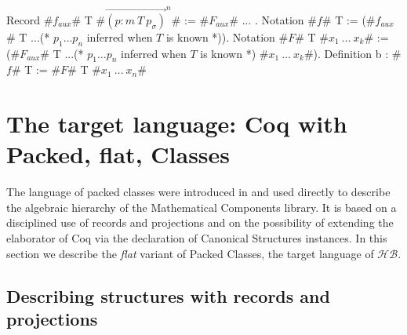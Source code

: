 \documentclass[a4paper,UKenglish,cleveref, autoref]{lipics-v2019}
\newcommand{\HB}{\ensuremath{\mathcal{HB}}}
\newcommand{\C}{\ensuremath{\mathcal{C}}}
\newcommand{\class}{class}
\newcommand{\cdef}{\ensuremath{\mathit{def}}}
\newcommand{\subclass}{subclass}
\newcommand{\join}{\ensuremath{\mathit{join}}}
\newcommand{\vect}[1]{\overrightarrow{#1}}
\newcommand{\pmp}[1]{\ensuremath{\vect{\left(p : m\ T\ p_\sigma\right)}^{#1}}}
\theoremstyle{implem}
\theoremstyle{implem}
\theoremstyle{command}
\theoremstyle{commands}
\begin{document}
\begin{coqcode}
Record #\(f_{aux}\)# T #\(\pmp{n}\)# := #\(F_{aux}\)# { ... }.
Notation #$f$# T := (#\(f_{aux}\)# T ...(* $p_1 \ldots p_n$ inferred when $T$ is known *)).
Notation #$F$# T  #\(x_1\ \ldots\ x_k\)# := (#\(F_{aux}\)# T ...(* $p_1 \ldots p_n$ inferred when $T$ is known *) #\(x_1\ \ldots\ x_k\)#).
Definition b : #$f$# T := #$F$# T #\(x_1\ \ldots\ x_n\)#
\end{coqcode}









\section{The target language: Coq with Packed, flat, Classes}
\label{sec:target-lang}

The language of packed classes were introduced in
\cite{DBLP:conf/tphol/GarillotGMR09} and used directly to describe the
algebraic hierarchy of the Mathematical Components library.
It is based on a disciplined use of records and projections and
on the possibility of extending the elaborator of Coq
via the declaration of Canonical Structures instances.
In this section we describe the \emph{flat} variant of
Packed Classes, the target language of \HB{}.

\subsection{Describing structures with records and projections}
\end{document}
